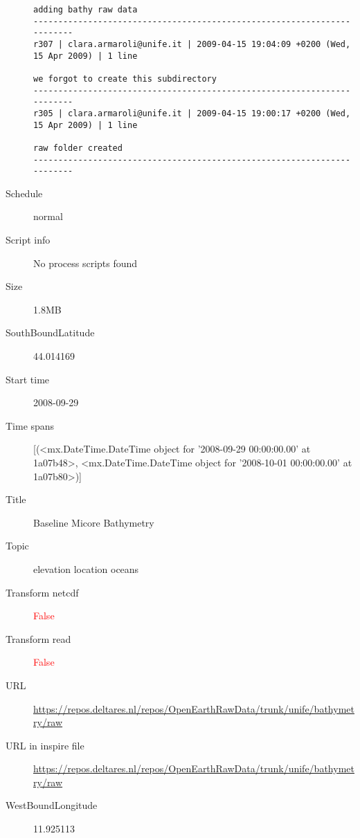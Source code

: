 \documentclass[9]{report}
\begin{document}
\begin{description}
\begin{verbatim}
adding bathy raw data
------------------------------------------------------------------------
r307 | clara.armaroli@unife.it | 2009-04-15 19:04:09 +0200 (Wed, 15 Apr 2009) | 1 line

we forgot to create this subdirectory
------------------------------------------------------------------------
r305 | clara.armaroli@unife.it | 2009-04-15 19:00:17 +0200 (Wed, 15 Apr 2009) | 1 line

raw folder created
------------------------------------------------------------------------

\end{verbatim}
  \item[Schedule] normal
  \item[Script info] No process scripts found
  \item[Size] 1.8MB
  \item[SouthBoundLatitude] 44.014169
  \item[Start time] 2008-09-29
  \item[Time spans] [(<mx.DateTime.DateTime object for '2008-09-29 00:00:00.00' at 1a07b48>, <mx.DateTime.DateTime object for '2008-10-01 00:00:00.00' at 1a07b80>)]
  \item[Title]  Baseline Micore Bathymetry 
  \item[Topic] elevation location oceans
  \item[Transform netcdf] \textcolor{red}{False}
  \item[Transform read] \textcolor{red}{False}
  \item[URL] \href{https://repos.deltares.nl/repos/OpenEarthRawData/trunk/unife/bathymetry/raw}{https://repos.deltares.nl/repos/OpenEarthRawData/trunk/unife/bathymetry/raw}
  \item[URL in inspire file] \href{https://repos.deltares.nl/repos/OpenEarthRawData/trunk/unife/bathymetry/raw}{https://repos.deltares.nl/repos/OpenEarthRawData/trunk/unife/bathymetry/raw}
  \item[WestBoundLongitude] 11.925113
\end{description}
\end{document}
